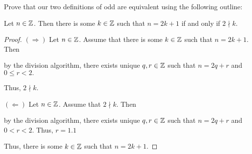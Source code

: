\documentclass[handout]{ximera}
\begin{document}
\begin{br}
    Prove that our two definitions of odd are equivalent using the following outline:
        \begin{proposition}
        Let $n\in\mathbb Z$. Then there is some $k\in\mathbb Z$ such that $n=2k+1$ if and only if $2\nmid k$.

        \begin{proof}
            $(\Rightarrow)$  Let $n\in\mathbb Z$. Assume that there is some $k\in\mathbb Z$ such that $n=2k+1$. Then 
            \begin{shortAnswer}[\vspace{3cm}]
                by the division algorithm, there exists unique $q,r\in\mathbb Z$ such that $n=2q+r$ and $0\leq r <2.$
            \end{shortAnswer}
            Thus, $2\nmid k$.

            $(\Leftarrow)$  Let $n\in\mathbb Z$. Assume that $2\nmid k$. Then
            \begin{shortAnswer}[\vspace{3cm}]
                by the division algorithm, there exists unique $q,r\in\mathbb Z$ such that $n=2q+r$ and $0< r <2.$ Thus, $r=1.1$ 
            \end{shortAnswer}
            Thus, there is some $k\in\mathbb Z$ such that $n=2k+1$.
        \end{proof}
    \end{proposition}
\end{br}
\end{document}

